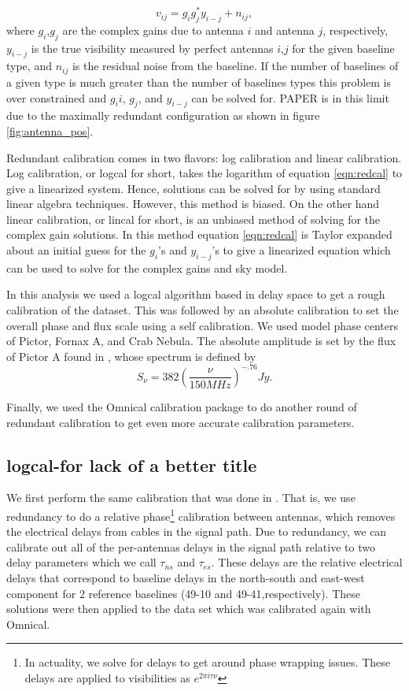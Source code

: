 \documentclass[twocolumn,numberedappendix]{emulateapj}
\begin{document}
\begin{equation}\label{eqn:redcal}
    v_{ij} = g_{i}g_{j}^{*}y_{i-j} + n_{ij},   
\end{equation}
where $g_{i}$,$g_{j}$ are the complex gains due to antenna $i$ and antenna $j$,
respectively, $y_{i-j}$ is the true visibility measured by perfect antennas
$i$,$j$ for the given baseline type, and $n_{ij}$ is the residual noise from
the baseline.  If the number of baselines of a given type is much greater than
the number of baselines types this problem is over constrained and $g_{i}i$,
$g_{j}$, and $y_{i-j}$ can be solved for. PAPER is in this limit due to the
maximally redundant configuration as shown in figure \ref{fig:antenna_pos}. 

Redundant calibration comes in two flavors: log calibration and linear
calibration. Log calibration, or logcal for short, takes the logarithm of
equation \ref{eqn:redcal} to give a linearized system. Hence, solutions can be
solved for by using standard linear algebra techniques. However, this method is
biased. On the other hand linear calibration, or lincal for short, is an
unbiased method of solving for the complex gain solutions. In this method
equation \ref{eqn:redcal} is Taylor expanded about an initial guess for the
$g_{i}$'s and $y_{i-j}$'s to give a linearized equation which can be used to
solve for the complex gains and sky model. 

In this analysis we used a logcal algorithm based in delay space to get a rough
calibration of the dataset. This was followed by an absolute calibration to set
the overall phase and flux scale using a self calibration. We used model phase
centers of Pictor, Fornax A, and Crab Nebula. The absolute amplitude is set
by the flux of Pictor A found in \cite{jacobs_et_al2013}, whose spectrum is
defined by 
\begin{equation}
    S_{\nu} = 382(\frac{\nu}{150 MHz})^{-.76} Jy.
\end{equation}

Finally, we used the Omnical calibration package to do another round of
redundant calibration to get even more accurate calibration parameters.

\subsection{logcal-for lack of a better title}
We first perform the same calibration that was
done in \citep{parsons_et_al2014a}. That is, we use redundancy to do a relative
phase\footnote{In actuality, we solve for delays to get around phase wrapping
issues. These delays are applied to visibilities as $e^{2\pi{i}\tau\nu}$}
calibration between antennas, which removes the electrical delays from cables in
the signal path. Due to redundancy, we can calibrate out all of the per-antennas
delays in the signal path relative to two delay parameters which we call
$\tau_{ns}$ and $\tau_{es}$. These delays are the relative electrical delays
that correspond to baseline delays in the north-south and east-west component
for 2 reference baselines (49-10 and 49-41,respectively). These solutions were
then applied to the data set which was calibrated again with Omnical. 
\end{document}
